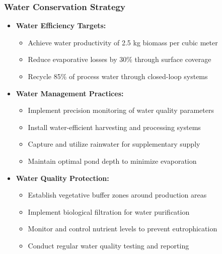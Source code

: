 \subsubsection{Water Conservation Strategy}
\begin{itemize}
    \item \textbf{Water Efficiency Targets:}
    \begin{itemize}
        \item Achieve water productivity of 2.5 kg biomass per cubic meter
        \item Reduce evaporative losses by 30\% through surface coverage
        \item Recycle 85\% of process water through closed-loop systems
    \end{itemize}
    
    \item \textbf{Water Management Practices:}
    \begin{itemize}
        \item Implement precision monitoring of water quality parameters
        \item Install water-efficient harvesting and processing systems
        \item Capture and utilize rainwater for supplementary supply
        \item Maintain optimal pond depth to minimize evaporation
    \end{itemize}
    
    \item \textbf{Water Quality Protection:}
    \begin{itemize}
        \item Establish vegetative buffer zones around production areas
        \item Implement biological filtration for water purification
        \item Monitor and control nutrient levels to prevent eutrophication
        \item Conduct regular water quality testing and reporting
    \end{itemize}
\end{itemize}


